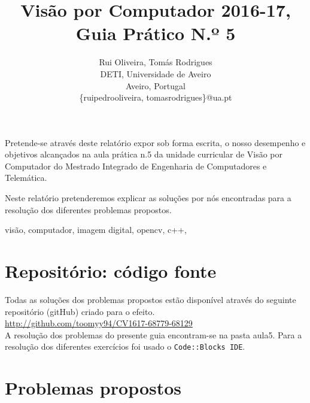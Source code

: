 \documentclass[portuguese, times, mirror]{revdetua}
\begin{document}

\title{Visão por Computador 2016-17, Guia Prático N.º 5}
\author{Rui Oliveira, Tomás Rodrigues\\ DETI, Universidade de Aveiro \\ Aveiro, Portugal \\ \{ruipedrooliveira, tomasrodrigues\}@ua.pt}
\maketitle

\begin{resumo}


Pretende-se através deste relatório expor sob forma escrita, o nosso desempenho e objetivos alcançados na aula prática n.5 da unidade curricular de Visão por Computador do Mestrado Integrado de Engenharia de Computadores e Telemática.

Neste relatório pretenderemos explicar as soluções por nós encontradas para a resolução dos diferentes problemas propostos.


\end{resumo} 

\begin{palavraschave} %
visão, computador, imagem digital, opencv, c++, 
 \end{palavraschave} %




\section{Repositório: código fonte}


Todas as soluções dos problemas propostos estão disponível através do seguinte repositório (gitHub) criado para o efeito. \\

\href{http://github.com/toomyy94/CV1617-68779-68129}{http://github.com/toomyy94/CV1617-68779-68129}
\\


A resolução dos problemas do presente guia encontram-se na pasta aula5. Para a resolução dos diferentes exercícios foi usado o \texttt{Code::Blocks IDE}. 



\section{Problemas propostos}
\end{document}
